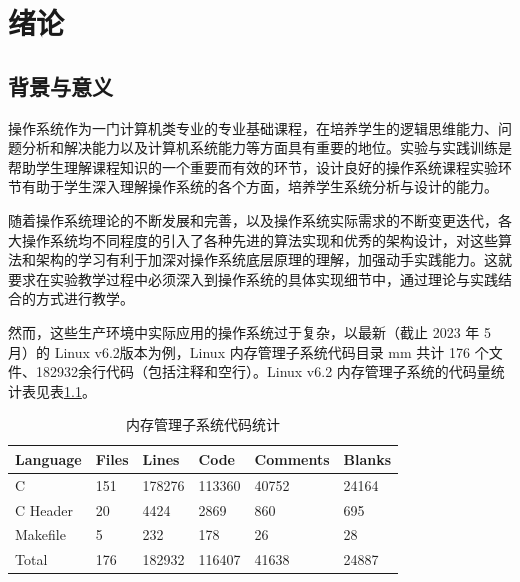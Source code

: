 \documentclass[AutoFakeBold]{LZUThesis}
\begin{document}
\begin{sloppypar}


\mainmatter

\chapter{绪论}


\section{背景与意义}

操作系统作为一门计算机类专业的专业基础课程，在培养学生的逻辑思维能力、问题分析和解决能力以及计算机系统能力等方面具有重要的地位。实验与实践训练是帮助学生理解课程知识的一个重要而有效的环节，设计良好的操作系统课程实验环节有助于学生深入理解操作系统的各个方面，培养学生系统分析与设计的能力。

随着操作系统理论的不断发展和完善，以及操作系统实际需求的不断变更迭代，各大操作系统均不同程度的引入了各种先进的算法实现和优秀的架构设计，对这些算法和架构的学习有利于加深对操作系统底层原理的理解，加强动手实践能力。这就要求在实验教学过程中必须深入到操作系统的具体实现细节中，通过理论与实践结合的方式进行教学。

然而，这些生产环境中实际应用的操作系统过于复杂，以最新（截止 2023 年 5 月）的 Linux v6.2版本为例，Linux 内存管理子系统代码目录 mm 共计 176 个文件、182932余行代码（包括注释和空行）。Linux v6.2 内存管理子系统的代码量统计表见表\ref{table:mm-code-stastic}。

\begin{longtable}[]{@{}llllll@{}}
\caption{内存管理子系统代码统计}\label{table:mm-code-stastic} \\
\toprule\noalign{}
Language & Files & Lines & Code & Comments & Blanks \\
\midrule\noalign{}
\endhead
\bottomrule\noalign{}
\endlastfoot
C & 151 & 178276 & 113360 & 40752 & 24164 \\
C Header & 20 & 4424 & 2869 & 860 & 695 \\
Makefile & 5 & 232 & 178 & 26 & 28 \\
Total & 176 & 182932 & 116407 & 41638 & 24887 \\
\end{longtable}


\end{sloppypar}
\end{document}
